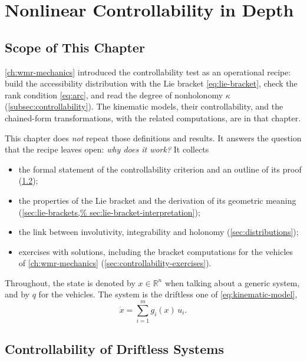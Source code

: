 \chapter{Nonlinear Controllability in Depth}
\label{ch:nonlinear-controllability}

\section{Scope of This Chapter}
\label{sec:controllability-scope}

\cref{ch:wmr-mechanics} introduced the controllability test as an
operational recipe: build the accessibility distribution with the Lie
bracket \cref{eq:lie-bracket}, check the rank condition \cref{eq:arc},
and read the degree of nonholonomy \( \kappa \)
(\cref{subsec:controllability}). The kinematic models, their
controllability, and the chained-form transformations, with the
related computations, are in that chapter.

This chapter does \emph{not} repeat those definitions and results. It
answers the question that the recipe leaves open: \emph{why does it
work?} It collects

\begin{itemize}
    \item the formal statement of the controllability criterion and an
          outline of its proof (\cref{sec:controllability-problem});
    \item the properties of the Lie bracket and the derivation of its
          geometric meaning (\cref{sec:lie-brackets,%
          sec:lie-bracket-interpretation});
    \item the link between involutivity, integrability and holonomy
          (\cref{sec:distributions});
    \item exercises with solutions, including the bracket
          computations for the vehicles of \cref{ch:wmr-mechanics}
          (\cref{sec:controllability-exercises}).
\end{itemize}

Throughout, the state is denoted by \( x \in \mathbb{R}^n \) when
talking about a generic system, and by \( q \) for the vehicles. The
system is the driftless one of \cref{eq:kinematic-model},
\begin{equation}
\label{eq:driftless-system}
    \dot{x} = \sum_{i=1}^{m} g_i(x)\, u_i .
\end{equation}

\section{Controllability of Driftless Systems}
\label{sec:controllability-problem}

